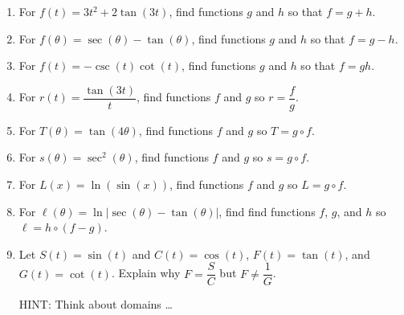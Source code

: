 \begin{enumerate}
\setcounter{enumi}{\value{HW}}

\item  For $f(t) = 3t^2 + 2 \tan(3t)$, find functions $g$ and $h$ so that $f=g+h$. \label{decomposebasicothercircularfirst}

\item  For $f(\theta) = \sec(\theta) - \tan(\theta)$, find functions $g$ and $h$ so that $f=g-h$. 

\item  For $f(t) = -\csc(t) \cot(t)$, find functions $g$ and $h$ so that $f=gh$.

\item  For $r(t) = \dfrac{\tan(3t)}{t}$, find functions $f$ and $g$ so $r = \dfrac{f}{g}$.

\item  For $T(\theta) =\tan(4 \theta)$, find functions $f$ and $g$ so $T = g \circ f$.

\item  For $s(\theta) = \sec^{2}(\theta)$, find functions $f$ and $g$ so $s = g \circ f$.

\item  For $L(x) = \ln (\sin(x) )$, find functions $f$ and $g$ so $L = g \circ f$.       

\item  For $\ell(\theta) = \ln | \sec(\theta) - \tan(\theta)|$, find  find functions $f$,  $g$, and $h$ so $\ell = h \circ (f-g)$.\label{decomposebasicothercircularlast}

\item  Let $S(t) = \sin(t)$ and $C(t) = \cos(t)$, $F(t) = \tan(t)$, and $G(t) = \cot(t)$.  Explain why $F = \dfrac{S}{C}$ but $F \neq \dfrac{1}{G}$.

HINT: Think about domains \ldots

\setcounter{HW}{\value{enumi}}
\end{enumerate}


\newpage


